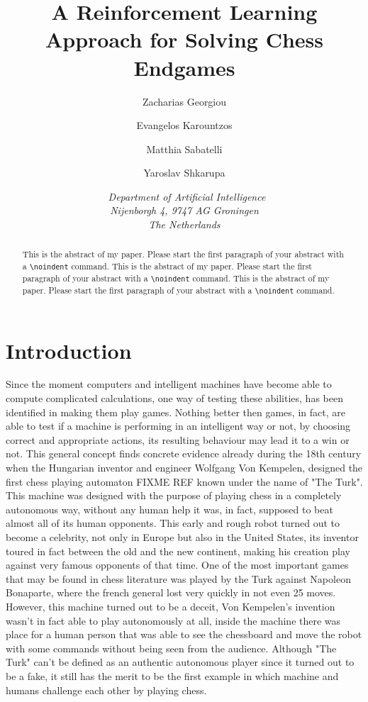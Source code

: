 \documentclass{article}
\title{\textbf{\huge A Reinforcement Learning Approach for Solving Chess Endgames}%
}
\author{Zacharias Georgiou \affila \and
    Evangelos Karountzos \affila \and
    Matthia Sabatelli \affila \and
    Yaroslav Shkarupa \affila}
\date{\affila\ \textit{Department of Artificial Intelligence\\
  Nijenborgh 4,
  9747 AG Groningen\\
  The Netherlands }\\
 }
\begin{document}
\ttl
\thispagestyle{empty}


\begin{abstract}
\noindent
This is the abstract of my paper. Please start the first paragraph of your abstract with a \verb+\noindent+ command.
This is the abstract of my paper. Please start the first paragraph of your abstract with a \verb+\noindent+ command.
This is the abstract of my paper. Please start the first paragraph of your abstract with a \verb+\noindent+ command.
\end{abstract}


\section{Introduction}

Since the moment computers and intelligent machines have become able to compute complicated calculations, one way of testing these abilities, has been identified in making them play games. Nothing better then games, in fact, are able to test if a machine is performing in an intelligent way or not, by choosing correct and appropriate actions, its resulting behaviour may lead it to a win or not. This general concept finds concrete evidence already during the 18th century when the Hungarian inventor and engineer Wolfgang Von Kempelen, designed the first chess playing automaton FIXME REF known under the name of "The Turk". This machine was designed with the purpose of playing chess in a completely autonomous way, without any human help it was, in fact, supposed to beat almost all of its human opponents. This early and rough robot turned out to become a celebrity, not only in Europe but also in the United States, its inventor toured in fact between the old and the new continent, making his creation play against very famous opponents of that time. One of the most important games that may be found in chess literature was played by the Turk against Napoleon Bonaparte, where the french general lost very quickly in not even 25 moves. However, this machine turned out to be a deceit, Von Kempelen's invention wasn't in fact able to play autonomously at all, inside the machine there was place for a human person that was able to see the chessboard and move the robot with some commands without being seen from the audience. Although "The Turk" can't be defined as an authentic autonomous player since it turned out to be a fake, it still has the merit to be the first example in which machine and humans challenge each other by playing chess.\\
\end{document}
